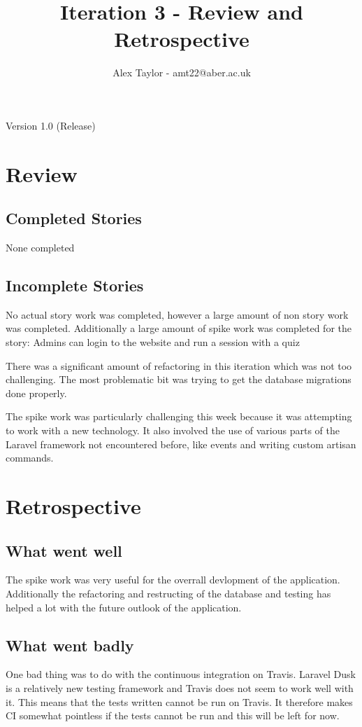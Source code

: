 \documentclass{article}
\title{Iteration 3 - Review and Retrospective}
\author{Alex Taylor - amt22@aber.ac.uk}
\begin{document}
\maketitle
\begin{center}
	Version 1.0 (Release)
\end{center}
\thispagestyle{empty}
\newpage

\section{Review}
\subsection{Completed Stories}
None completed
\subsection{Incomplete Stories}
No actual story work was completed, however a large amount of non story work was completed. Additionally a large amount of spike work was completed for the story: Admins can login to the website and run a session with a quiz

There was a significant amount of refactoring in this iteration which was not too challenging. The most problematic bit was trying to get the database migrations done properly.

The spike work was particularly challenging this week because it was attempting to work with a new technology. It also involved the use of various parts of the Laravel framework not encountered before, like events and writing custom artisan commands.
\newpage

\section{Retrospective}
\subsection{What went well}
The spike work was very useful for the overrall devlopment of the application. Additionally the refactoring and restructing of the database and testing has helped a lot with the future outlook of the application.
\subsection{What went badly}
One bad thing was to do with the continuous integration on Travis. Laravel Dusk is a relatively new testing framework and Travis does not seem to work well with it. This means that the tests written cannot be run on Travis. It therefore makes CI somewhat pointless if the tests cannot be run and this will be left for now.
\end{document}
